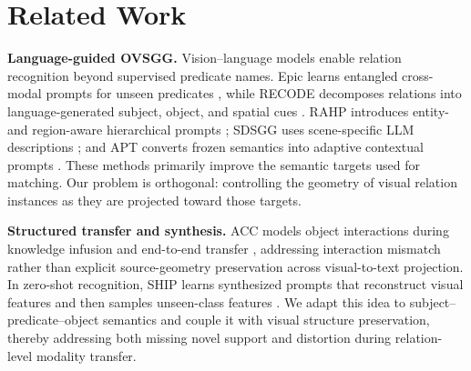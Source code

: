 \section{Related Work}
\label{sec:related}

\textbf{Language-guided OVSGG.}
Vision--language models enable relation recognition beyond supervised predicate
names. Epic learns entangled cross-modal prompts for unseen predicates
\cite{yu2023epic}, while RECODE decomposes relations into language-generated
subject, object, and spatial cues \cite{li2023recode}. RAHP introduces
entity- and region-aware hierarchical prompts \cite{liu2025rahp}; SDSGG uses
scene-specific LLM descriptions \cite{chen2024sdsgg}; and APT converts frozen
semantics into adaptive contextual prompts \cite{luo2026apt}. These methods
primarily improve the semantic targets used for matching. Our problem is
orthogonal: controlling the geometry of visual relation instances as they are
projected toward those targets.

\textbf{Structured transfer and synthesis.}
ACC models object interactions during knowledge infusion and end-to-end
transfer \cite{li2025acc}, addressing interaction mismatch rather than explicit
source-geometry preservation across visual-to-text projection. In zero-shot recognition, SHIP
learns synthesized prompts that reconstruct visual features and then samples
unseen-class features \cite{wang2023ship}. We adapt this idea to
subject--predicate--object semantics and couple it with visual structure
preservation, thereby addressing both missing novel support and distortion
during relation-level modality transfer.
